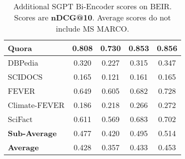 \documentclass{article}
\begin{document}
\begin{table*}[!h]
{\begin{tabular}{l | c | c c c }
    Quora & 0.808
    & 0.730
    & 0.853
    & 0.856 \\ \midrule
    
    DBPedia & 0.320
    & 0.227
    & 0.315
    & 0.347 \\ \midrule
   
    SCIDOCS & 0.165
    & 0.121
    & 0.161
    & 0.165 \\ \midrule
   
    FEVER & 0.649 
    & 0.605
    & 0.682
    & 0.728 \\ 
    
    Climate-FEVER & 0.186
    & 0.218
    & 0.266
    & 0.272 \\ 
    
    SciFact & 0.611
    & 0.569
    & 0.683
    & 0.702 \\ \midrule
    
    \textbf{Sub-Average} & 0.477
    & 0.420
    & 0.495
    & 0.514\\
    
    \textbf{Average} & 0.428
    & 0.357
    & 0.433
    & 0.453\\

    \bottomrule
    \end{tabular}}
    \caption{Additional SGPT Bi-Encoder scores on BEIR. Scores are \textbf{nDCG@10}. Average scores do not include MS MARCO.}
    \label{tab:beirceextra}
\end{table*}
\end{document}
